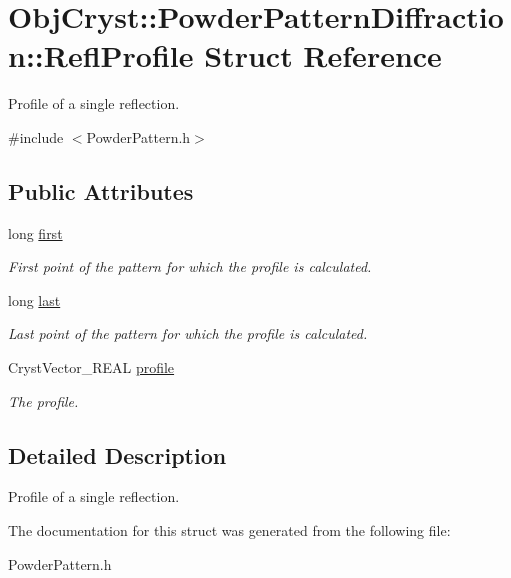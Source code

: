 \hypertarget{struct_obj_cryst_1_1_powder_pattern_diffraction_1_1_refl_profile}{}\section{Obj\+Cryst\+::Powder\+Pattern\+Diffraction\+::Refl\+Profile Struct Reference}
\label{struct_obj_cryst_1_1_powder_pattern_diffraction_1_1_refl_profile}


Profile of a single reflection.  




{\ttfamily \#include $<$Powder\+Pattern.\+h$>$}

\subsection*{Public Attributes}
\begin{DoxyCompactItemize}
\item 
\mbox{\label{struct_obj_cryst_1_1_powder_pattern_diffraction_1_1_refl_profile_a0074278f5c7c2db3636f12398983c27b}} 
long \mbox{\hyperlink{struct_obj_cryst_1_1_powder_pattern_diffraction_1_1_refl_profile_a0074278f5c7c2db3636f12398983c27b}{first}}
\begin{DoxyCompactList}\small\item\em First point of the pattern for which the profile is calculated. \end{DoxyCompactList}\item 
\mbox{\label{struct_obj_cryst_1_1_powder_pattern_diffraction_1_1_refl_profile_a5c046412417d8bd818643b2e85bdfa81}} 
long \mbox{\hyperlink{struct_obj_cryst_1_1_powder_pattern_diffraction_1_1_refl_profile_a5c046412417d8bd818643b2e85bdfa81}{last}}
\begin{DoxyCompactList}\small\item\em Last point of the pattern for which the profile is calculated. \end{DoxyCompactList}\item 
\mbox{\label{struct_obj_cryst_1_1_powder_pattern_diffraction_1_1_refl_profile_ac0babcc11d71c583bc1bd809d984cd6e}} 
Cryst\+Vector\+\_\+\+R\+E\+AL \mbox{\hyperlink{struct_obj_cryst_1_1_powder_pattern_diffraction_1_1_refl_profile_ac0babcc11d71c583bc1bd809d984cd6e}{profile}}
\begin{DoxyCompactList}\small\item\em The profile. \end{DoxyCompactList}\end{DoxyCompactItemize}


\subsection{Detailed Description}
Profile of a single reflection. 

The documentation for this struct was generated from the following file\+:\begin{DoxyCompactItemize}
\item 
Powder\+Pattern.\+h\end{DoxyCompactItemize}
